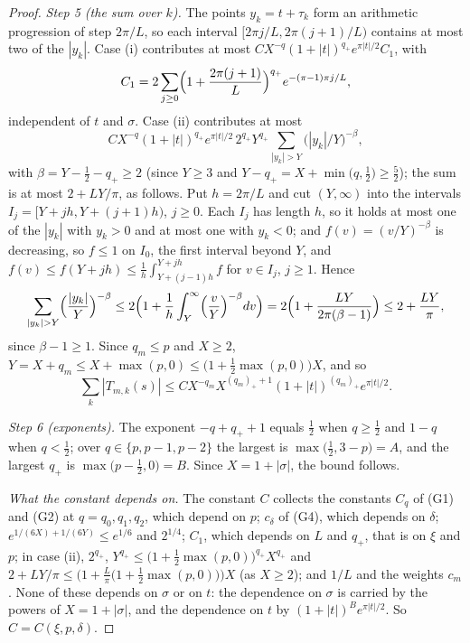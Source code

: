 \documentclass[11pt]{article}
\begin{document}
\begin{proof}
\emph{Step 5 (the sum over $k$).} The points $y_k=t+\tau_k$ form an arithmetic progression of step $2\pi/L$, so each interval $[2\pi j/L,2\pi(j+1)/L)$ contains at most two of the $|y_k|$. Case (i) contributes at most $CX^{-q}(1+|t|)^{q_+}e^{\pi|t|/2}C_1$, with
\[
C_1=2\sum_{j\ge0}\Bigl(1+\frac{2\pi(j+1)}{L}\Bigr)^{q_+}e^{-(\pi-1)\pi j/L},
\]
independent of $t$ and $\sigma$. Case (ii) contributes at most
\[
CX^{-q}(1+|t|)^{q_+}e^{\pi|t|/2}\,2^{q_+}Y^{q_+}\sum_{|y_k|>Y}\bigl(|y_k|/Y\bigr)^{-\beta},
\]
with $\beta=Y-\frac12-q_+\ge2$ (since $Y\ge3$ and $Y-q_+=X+\min\bigl(q,\frac12\bigr)\ge\frac52$); the sum is at most $2+LY/\pi$, as follows. Put $h=2\pi/L$ and cut $(Y,\infty)$ into the intervals $I_j=[Y+jh,Y+(j+1)h)$, $j\ge0$. Each $I_j$ has length $h$, so it holds at most one of the $|y_k|$ with $y_k>0$ and at most one with $y_k<0$; and $f(v)=(v/Y)^{-\beta}$ is decreasing, so $f\le1$ on $I_0$, the first interval beyond $Y$, and $f(v)\le f(Y+jh)\le\frac1h\int_{Y+(j-1)h}^{Y+jh}f$ for $v\in I_j$, $j\ge1$. Hence
\[
\sum_{|y_k|>Y}\Bigl(\frac{|y_k|}{Y}\Bigr)^{-\beta}\le2\Bigl(1+\frac1h\int_Y^\infty\Bigl(\frac vY\Bigr)^{-\beta}dv\Bigr)=2\Bigl(1+\frac{LY}{2\pi(\beta-1)}\Bigr)\le2+\frac{LY}{\pi},
\]
since $\beta-1\ge1$. Since $q_m\le p$ and $X\ge2$, $Y=X+q_m\le X+\max(p,0)\le\bigl(1+\tfrac12\max(p,0)\bigr)X$, and so
\[
\sum_k|T_{m,k}(s)|\le C X^{-q_m}X^{(q_m)_++1}(1+|t|)^{(q_m)_+}e^{\pi|t|/2}.
\]

\emph{Step 6 (exponents).} The exponent $-q+q_++1$ equals $\frac12$ when $q\ge\frac12$ and $1-q$ when $q<\frac12$; over $q\in\{p,p-1,p-2\}$ the largest is $\max\bigl(\frac12,3-p\bigr)=A$, and the largest $q_+$ is $\max\bigl(p-\frac12,0\bigr)=B$. Since $X=1+|\sigma|$, the bound follows.

\emph{What the constant depends on.} The constant $C$ collects the constants $C_q$ of (G1) and (G2) at $q=q_0,q_1,q_2$, which depend on $p$; $c_\delta$ of (G4), which depends on $\delta$; $e^{1/(6X)+1/(6Y)}\le e^{1/6}$ and $2^{1/4}$; $C_1$, which depends on $L$ and $q_+$, that is on $\xi$ and $p$; in case (ii), $2^{q_+}$, $Y^{q_+}\le\bigl(1+\frac12\max(p,0)\bigr)^{q_+}X^{q_+}$ and $2+LY/\pi\le\bigl(1+\frac L\pi\bigl(1+\frac12\max(p,0)\bigr)\bigr)X$ (as $X\ge2$); and $1/L$ and the weights $c_m$. None of these depends on $\sigma$ or on $t$: the dependence on $\sigma$ is carried by the powers of $X=1+|\sigma|$, and the dependence on $t$ by $(1+|t|)^Be^{\pi|t|/2}$. So $C=C(\xi,p,\delta)$.


\end{proof}
\end{document}
